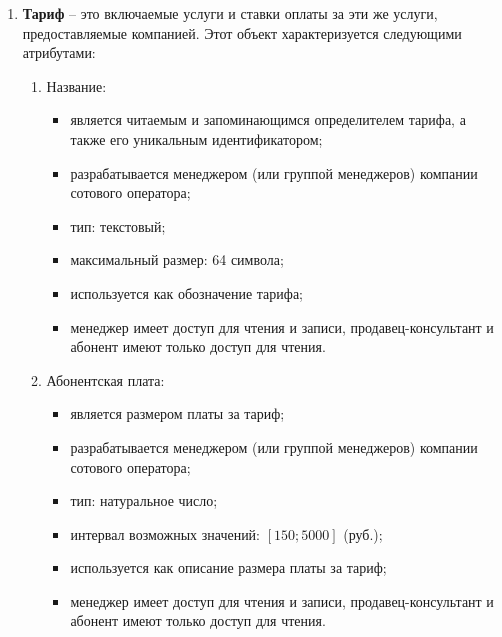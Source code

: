 \begin{enumerate}
    \item \textbf{Тариф} -- это включаемые услуги и ставки оплаты за эти же услуги, предоставляемые компанией. Этот объект характеризуется следующими атрибутами:
    \begin{enumerate}
        \item Название:
        \begin{itemize}
            \item является читаемым и запоминающимся определителем тарифа, а также его уникальным идентификатором;
            \item разрабатывается менеджером (или группой менеджеров) компании сотового оператора;
            \item тип: текстовый;
            \item максимальный размер: 64 символа;
            \item используется как обозначение тарифа;
            \item менеджер имеет доступ для чтения и записи, продавец-консультант и абонент имеют только доступ для чтения.
        \end{itemize}

        \item Абонентская плата:
        \begin{itemize}
            \item является размером платы за тариф;
            \item разрабатывается менеджером (или группой менеджеров) компании сотового оператора;
            \item тип: натуральное число;
            \item интервал возможных значений: $[150; 5000]$ (руб.); %
            \item используется как описание размера платы за тариф;
            \item менеджер имеет доступ для чтения и записи, продавец-консультант и абонент имеют только доступ для чтения.
        \end{itemize}


\end{enumerate}
\end{enumerate}
